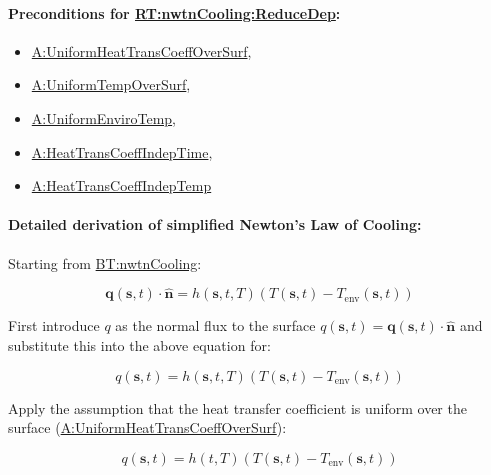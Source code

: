\documentclass[12pt]{article}
\begin{document}
\paragraph{Preconditions for \hyperref[RT:nwtnCooling:ReduceDep]{RT:nwtnCooling:ReduceDep}:}
\label{RT:nwtnCooling:ReduceDepPrecond}

\begin{itemize}
\item \hyperref[assumpUnifHeatTransCoeff]{A:UniformHeatTransCoeffOverSurf},
\item \hyperref[assumpUnifTempSurf]{A:UniformTempOverSurf},
\item \hyperref[assumpUnifEnviroTempSurf]{A:UniformEnviroTemp},
\item \hyperref[assumpHeatTransIndepTime]{A:HeatTransCoeffIndepTime},
\item \hyperref[assumpHeatTransIndepTemp]{A:HeatTransCoeffIndepTemp}
\end{itemize}


\paragraph{Detailed derivation of simplified Newton's Law of Cooling:}
\label{RT:nwtnCooling:ReduceDepDeriv}

Starting from \hyperref[BT:nwtnCooling]{BT:nwtnCooling}:

\begin{displaymath} 
        \textbf{q}\left(\textbf{s}, t\right) \cdot
        \symbf{\hat{n}} = h(\textbf{s}, t, T) (T(\textbf{s}, t) -
        T_{\text{env}}(\textbf{s}, t))
\end{displaymath}

\noindent First introduce $q$ as the normal flux to the surface $q(\textbf{s},
t) = \textbf{q}\left(\textbf{s}, t\right) \cdot \symbf{\hat{n}}$ and substitute
this into the above equation for:

\begin{displaymath} 
        q(\textbf{s}, t) = h(\textbf{s}, t, T) (T(\textbf{s}, t) -
        T_{\text{env}}(\textbf{s}, t))
\end{displaymath}

\noindent Apply the assumption that the heat transfer coefficient is uniform
over the surface (\hyperref[assumpUnifHeatTransCoeff]{A:UniformHeatTransCoeffOverSurf}):

\begin{displaymath} 
        q(\textbf{s}, t) = h(t, T) (T(\textbf{s}, t) -
        T_{\text{env}}(\textbf{s}, t))
\end{displaymath}
\end{document}
